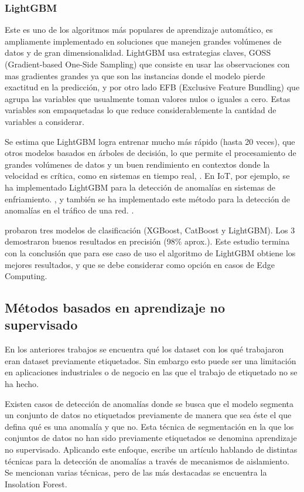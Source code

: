 \documentclass[11pt,a4paper,spanish]{book}
\numberwithin{equation}{chapter}
\numberwithin{figure}{chapter}
\begin{document}
\subsubsection{LightGBM}


Este es uno de los algoritmos más populares de aprendizaje automático, es ampliamente 
implementado en soluciones que manejen grandes volúmenes de datos y de gran 
dimensionalidad. LightGBM usa estrategias claves, GOSS 
(Gradient-based One-Side Sampling) que consiste en usar las observaciones con mas 
gradientes grandes ya que son las instancias donde el modelo pierde exactitud en la 
predicción, y por otro lado EFB (Exclusive Feature Bundling) que agrupa las variables 
que usualmente toman valores nulos o iguales a cero. Estas variables son empaquetadas 
lo que reduce considerablemente la cantidad de variables a considerar.


Se estima que LightGBM logra entrenar mucho más rápido (hasta 20 veces), que otros 
modelos basados en árboles de decisión, lo que permite el procesamiento de grandes 
volúmenes de datos y un buen rendimiento en contextos donde la velocidad es crítica, 
como en sistemas en tiempo real, \cite{ke2017lightgbm}. En IoT, por ejemplo, se ha 
implementado LightGBM para la detección de anomalías en sistemas de enfriamiento. 
\cite{yanabe2020lightgbm}, y también se ha implementado este método para la detección 
de anomalías en el tráfico de una red. \cite{islam2020lightgbm}. 


\cite{delasmorenas2025bearing} probaron tres modelos de clasificación 
(XGBoost, CatBoost y LightGBM). Los 3 demostraron buenos resultados en 
precisión (98\% aprox.). Este estudio termina con la conclusión que para ese caso de 
uso el algoritmo de LightGBM obtiene los mejores resultados, y que se debe considerar 
como opción en casos de Edge Computing.


\subsection{Métodos basados en aprendizaje no supervisado}


En los anteriores trabajos se encuentra qué los dataset con los qué trabajaron eran 
dataset previamente etiquetados. Sin embargo esto puede ser una limitación en 
aplicaciones industriales o de negocio en las que el trabajo de etiquetado no se ha 
hecho.


Existen casos de detección de anomalías donde se busca que el modelo segmenta un 
conjunto de datos no etiquetados previamente de manera que sea éste el que defina qué 
es una anomalía y que no. Esta técnica de segmentación en la que los conjuntos de datos 
no han sido previamente etiquetados se denomina aprendizaje no supervisado. Aplicando 
este enfoque,  \cite{Cao_2025} escribe un artículo hablando de distintas técnicas para 
la detección de anomalías a través de mecanismos de aislamiento. Se mencionan varias 
técnicas, pero de las más destacadas se encuentra la Insolation Forest.
\end{document}
